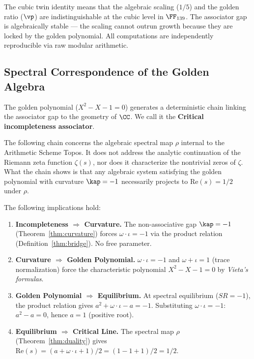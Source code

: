 \begin{remark}
The cubic twin identity means that the algebraic scaling ($1/5$) and the golden ratio ($\vp$) are indistinguishable at the cubic level in $\FF_{139}$. The associator gap is algebraically stable --- the scaling cannot outrun growth because they are locked by the golden polynomial. All computations are independently reproducible via raw modular arithmetic.
\end{remark}


\subsection{Spectral Correspondence of the Golden Algebra}

The golden polynomial ($X^2 - X - 1 = 0$) generates a deterministic chain linking the associator gap to the geometry of $\CC$. We call it the \textbf{Critical incompleteness associator}.

\begin{remark}
The following chain concerns the algebraic spectral map $\rho$ internal to the Arithmetic Scheme Topos. It does not address the analytic continuation of the Riemann zeta function $\zeta(s)$, nor does it characterize the nontrivial zeros of $\zeta$. What the chain shows is that any algebraic system satisfying the golden polynomial with curvature $\kap = -1$ necessarily projects to $\mathrm{Re}(s) = 1/2$ under $\rho$.
\end{remark}

\begin{theorem}\label{thm:spectral-chain}
The following implications hold:
\begin{enumerate}
\item \textbf{Incompleteness $\Rightarrow$ Curvature.} The non-associative gap $\kap = -1$ (Theorem~\ref{thm:curvature}) forces $\omega \cdot \iota = -1$ via the product relation (Definition~\ref{thm:bridge}). No free parameter.
\item \textbf{Curvature $\Rightarrow$ Golden Polynomial.} $\omega \cdot \iota = -1$ and $\omega + \iota = 1$ (trace normalization) force the characteristic polynomial $X^2 - X - 1 = 0$ by \emph{Vieta's formulas}.
\item \textbf{Golden Polynomial $\Rightarrow$ Equilibrium.} At spectral equilibrium ($SR = -1$), the product relation gives $a^2 + \omega \cdot \iota - a = -1$. Substituting $\omega \cdot \iota = -1$: $a^2 - a = 0$, hence $a = 1$ (positive root).
\item \textbf{Equilibrium $\Rightarrow$ Critical Line.} The spectral map $\rho$ (Theorem~\ref{thm:duality}) gives $\mathrm{Re}(s) = (a + \omega \cdot \iota + 1)/2 = (1 - 1 + 1)/2 = 1/2$.
\end{enumerate}
\end{theorem}


